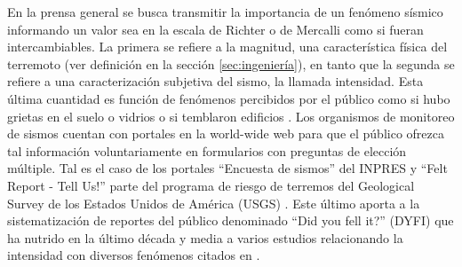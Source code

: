 \documentclass[a4paper]{report}
\begin{document}
%
%

En la prensa general se busca transmitir la importancia de un fenómeno sísmico informando un valor sea en la escala de Richter o de Mercalli como si fueran intercambiables.
La primera se refiere a la magnitud, una característica física del terremoto (ver definición en la sección \ref{sec:ingeniería}), en tanto que la segunda se refiere a una caracterización subjetiva del sismo, la llamada intensidad.
Esta última cuantidad es función de fenómenos percibidos por el público como si hubo grietas en el suelo o vidrios o si temblaron edificios \cite[sección 4.2.3]{fowler_solid_1990}.
Los organismos de monitoreo de sismos cuentan con portales en la world-wide web para que el público ofrezca tal información voluntariamente en formularios con preguntas de elección múltiple.
Tal es el caso de los portales ``Encuesta de sismos'' del INPRES \cite{noauthor_encuesta_nodate} y ``Felt Report - Tell Us!'' \cite{noauthor_felt_nodate} parte del programa de riesgo de terremos del Geological Survey de los Estados Unidos de América (USGS) \cite{david_jay_usgs_2012}. 
Este último aporta a la sistematización de reportes del público denominado ``Did you fell it?'' (DYFI) que ha nutrido en la último década y media a varios estudios relacionando la intensidad con diversos fenómenos citados en \cite{noauthor_dyfi_nodate}.
\end{document}

